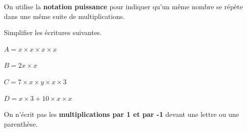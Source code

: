 \documentclass[a4paper]{book}
\begin{document}
    \begin{convention}
        On utilise la \textbf{notation puissance} pour indiquer qu'un même nombre se répète dans une même suite de multiplications. 
    \end{convention}


    \begin{exemple}
        Simplifier les écritures suivantes.

        \medskip

        \begin{minipage}{0.24\linewidth}
            $A=x\times x\times x\times x$

            \vspace{1cm}
        \end{minipage}
        \hfill\vline\hfill
        \begin{minipage}{0.24\linewidth}
            $B=2x\times x$

            \vspace{1cm}
        \end{minipage}
        \hfill\vline\hfill
        \begin{minipage}{0.24\linewidth}
            $C=7\times x\times y \times x \times 3$

            \vspace{1cm}
        \end{minipage}
        \hfill\vline\hfill
        \begin{minipage}{0.24\linewidth}
            $D=x\times3+10\times x\times x$

            \vspace{1cm}
        \end{minipage}
    \end{exemple}


    \begin{convention}
        On n'écrit pas les \textbf{multiplications par 1 et par -1} devant une lettre ou une parenthèse.
    \end{convention}
    
\end{document}

